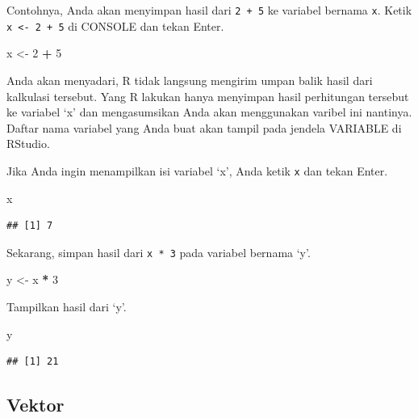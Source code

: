 \documentclass[openany]{book}
\newenvironment{Shaded}{\begin{snugshade}}{\end{snugshade}}
\newcommand{\DecValTok}[1]{\textcolor[rgb]{0.00,0.00,0.81}{#1}}
\newcommand{\StringTok}[1]{\textcolor[rgb]{0.31,0.60,0.02}{#1}}
\newcommand{\OperatorTok}[1]{\textcolor[rgb]{0.81,0.36,0.00}{\textbf{#1}}}
\newcommand{\NormalTok}[1]{#1}
\begin{document}
Contohnya, Anda akan menyimpan hasil dari \texttt{2\ +\ 5} ke variabel
bernama \texttt{x}. Ketik \texttt{x\ \textless{}-\ 2\ +\ 5} di CONSOLE
dan tekan Enter.

\begin{Shaded}
\begin{Highlighting}[]
\NormalTok{x <-}\StringTok{ }\DecValTok{2} \OperatorTok{+}\StringTok{ }\DecValTok{5}
\end{Highlighting}
\end{Shaded}

Anda akan menyadari, R tidak langsung mengirim umpan balik hasil dari
kalkulasi tersebut. Yang R lakukan hanya menyimpan hasil perhitungan
tersebut ke variabel `x' dan mengasumsikan Anda akan menggunakan varibel
ini nantinya. Daftar nama variabel yang Anda buat akan tampil pada
jendela VARIABLE di RStudio.

Jika Anda ingin menampilkan isi variabel `x', Anda ketik \texttt{x} dan
tekan Enter.

\begin{Shaded}
\begin{Highlighting}[]
\NormalTok{x}
\end{Highlighting}
\end{Shaded}

\begin{verbatim}
## [1] 7
\end{verbatim}

Sekarang, simpan hasil dari \texttt{x\ *\ 3} pada variabel bernama `y'.

\begin{Shaded}
\begin{Highlighting}[]
\NormalTok{y <-}\StringTok{ }\NormalTok{x }\OperatorTok{*}\StringTok{ }\DecValTok{3}
\end{Highlighting}
\end{Shaded}

Tampilkan hasil dari `y'.

\begin{Shaded}
\begin{Highlighting}[]
\NormalTok{y}
\end{Highlighting}
\end{Shaded}

\begin{verbatim}
## [1] 21
\end{verbatim}

\subsection{Vektor}\label{vektor}
\end{document}
